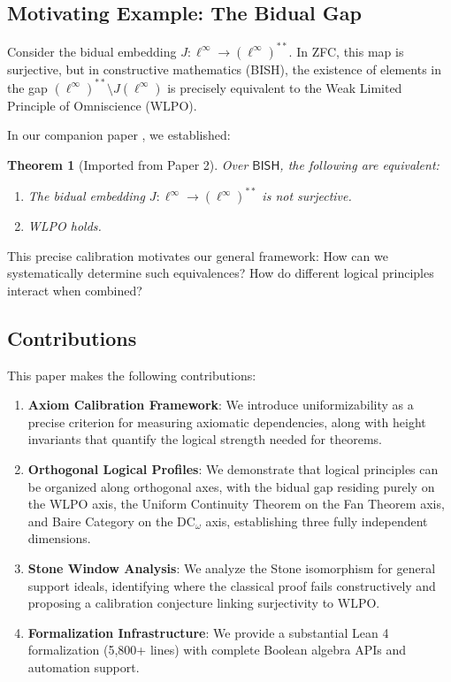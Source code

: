 \documentclass[11pt]{article}
\newtheorem{theorem}{Theorem}[section]
\newcommand{\DCw}{\mathrm{DC}_\omega}
\newcommand{\BISH}{\mathsf{BISH}}
\newcommand{\linf}{\ell^\infty}
\begin{document}
\subsection{Motivating Example: The Bidual Gap}

Consider the bidual embedding $J: \linf \to (\linf)^{**}$. In ZFC, this map is surjective, but in constructive mathematics (BISH), the existence of elements in the gap $(\linf)^{**} \setminus J(\linf)$ is precisely equivalent to the Weak Limited Principle of Omniscience (WLPO).

In our companion paper \cite{Paper2}, we established:

\begin{theorem}[Imported from Paper 2]\label{thm:paper2}
Over $\BISH$, the following are equivalent:
\begin{enumerate}
\item The bidual embedding $J: \linf \to (\linf)^{**}$ is not surjective.
\item WLPO holds.
\end{enumerate}
\end{theorem}

This precise calibration motivates our general framework: How can we systematically determine such equivalences? How do different logical principles interact when combined?

\subsection{Contributions}

This paper makes the following contributions:

\begin{enumerate}
\item \textbf{Axiom Calibration Framework}: We introduce uniformizability as a precise criterion for measuring axiomatic dependencies, along with height invariants that quantify the logical strength needed for theorems.

\item \textbf{Orthogonal Logical Profiles}: We demonstrate that logical principles can be organized along orthogonal axes, with the bidual gap residing purely on the WLPO axis, the Uniform Continuity Theorem on the Fan Theorem axis, and Baire Category on the $\DCw$ axis, establishing three fully independent dimensions.

\item \textbf{Stone Window Analysis}: We analyze the Stone isomorphism for general support ideals, identifying where the classical proof fails constructively and proposing a calibration conjecture linking surjectivity to WLPO.

\item \textbf{Formalization Infrastructure}: We provide a substantial Lean 4 formalization (5,800+ lines) with complete Boolean algebra APIs and automation support.
\end{enumerate}
\end{document}

